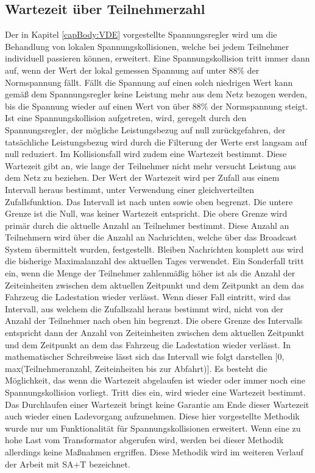 \subsection{Wartezeit über Teilnehmerzahl}
\label{cap:background_sec:SA_participants}
Der in Kapitel \ref{capBody:VDE} vorgestellte Spannungsregler wird um die Behandlung von lokalen Spannungskollisionen, welche bei jedem Teilnehmer individuell passieren können, erweitert. Eine Spannungskollision tritt immer dann auf, wenn der Wert der lokal gemessen Spannung auf unter 88\% der Normspannung fällt. Fällt die Spannung auf einen solch niedrigen Wert kann gemäß dem Spannungsregler keine Leistung mehr aus dem Netz bezogen werden, bis die Spannung wieder auf einen Wert von über 88\% der Normspannung steigt. Ist eine Spannungskollision aufgetreten, wird, geregelt durch den Spannungsregler, der mögliche Leistungsbezug auf null zurückgefahren, der tatsächliche Leistungsbezug wird durch die Filterung der Werte erst langsam auf null reduziert. Im Kollisionsfall wird zudem eine Wartezeit bestimmt. Diese Wartezeit gibt an, wie lange der Teilnehmer nicht mehr versucht Leistung aus dem Netz zu beziehen. Der Wert der Wartezeit wird per Zufall aus einem Intervall heraus bestimmt, unter Verwendung einer gleichverteilten Zufallsfunktion. Das Intervall ist nach unten sowie oben begrenzt. Die untere Grenze ist die Null, was keiner Wartezeit entspricht. Die obere Grenze wird primär durch die aktuelle Anzahl an Teilnehmer bestimmt. Diese Anzahl an Teilnehmern wird über die Anzahl an Nachrichten, welche über das Broadcast System übermittelt wurden, festgestellt. Bleiben Nachrichten komplett aus wird die bisherige Maximalanzahl des aktuellen Tages verwendet. Ein Sonderfall tritt ein, wenn die Menge der Teilnehmer zahlenmäßig höher ist als die Anzahl der Zeiteinheiten zwischen dem aktuellen Zeitpunkt und dem Zeitpunkt an dem das Fahrzeug die Ladestation wieder verlässt. Wenn dieser Fall eintritt, wird das Intervall, aus welchem die Zufallszahl heraus bestimmt wird, nicht von der Anzahl der Teilnehmer nach oben hin begrenzt. Die obere Grenze des Intervalls entspricht dann der Anzahl von Zeiteinheiten zwischen dem aktuellen Zeitpunkt und dem Zeitpunkt an dem das Fahrzeug die Ladestation wieder verlässt.  In mathematischer Schreibweise lässt sich das Intervall wie folgt darstellen [0, max(Teilnehmeranzahl, Zeiteinheiten bis zur Abfahrt)]. Es besteht die Möglichkeit, das wenn die Wartezeit abgelaufen ist wieder oder immer noch eine Spannungskollision vorliegt. Tritt dies ein, wird wieder eine Wartezeit bestimmt. Das Durchlaufen einer Wartezeit bringt keine Garantie am Ende dieser Wartezeit auch wieder einen Ladevorgang aufzunehmen. Diese hier vorgestellte Methodik wurde nur um Funktionalität für Spannungskollisionen erweitert. Wenn eine zu hohe Last vom Transformator abgerufen wird, werden bei dieser Methodik allerdings keine Maßnahmen ergriffen. Diese Methodik wird im weiteren Verlauf der Arbeit mit SA+T bezeichnet.\\
